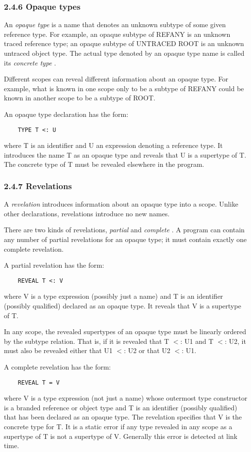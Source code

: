 \documentclass[10pt]{article}
\begin{document}
\subsubsection*{2.4.6 Opaque types}

An \emph{opaque type} is a name that denotes an unknown subtype of some given
reference type.  For example, an opaque subtype of REFANY is an unknown traced
reference type; an opaque subtype of UNTRACED ROOT is an unknown untraced
object type.  The actual type denoted by an opaque type name is called its
\emph{concrete type} .

Different scopes can reveal different information about an opaque type.  For
example, what is known in one scope only to be a subtype of REFANY could be
known in another scope to be a subtype of ROOT.

An opaque type declaration has the form:
\begin{verbatim}
    TYPE T <: U
\end{verbatim}
where T is an identifier and U an expression denoting a reference type.  It
introduces the name T as an opaque type and reveals that U is a supertype of
T.  The concrete type of T must be revealed elsewhere in the program.

\subsubsection*{2.4.7 Revelations}

A \emph{revelation} introduces information about an opaque type into a
scope.  Unlike other declarations, revelations introduce no new names.

There are two kinds of revelations, \emph{partial} and \emph{complete} .  A
program can contain any number of partial revelations for an opaque type; it
must contain exactly one complete revelation.

A partial revelation has the form:
\begin{verbatim}
    REVEAL T <: V
\end{verbatim}
where V is a type expression (possibly just a name) and T is an identifier
(possibly qualified) declared as an opaque type.  It reveals that V is a
supertype of T.

In any scope, the revealed supertypes of an opaque type must be linearly
ordered by the subtype relation.  That is, if it is revealed that T $<$: U1 and
T $<$: U2, it must also be revealed either that U1 $<$: U2 or that U2 $<$: U1.

A complete revelation has the form:
\begin{verbatim}
    REVEAL T = V
\end{verbatim}
where V is a type expression (not just a name) whose outermost type
constructor is a branded reference or object type and T is an identifier
(possibly qualified) that has been declared as an opaque type.  The revelation
specifies that V is the concrete type for T.  It is a static error if any type
revealed in any scope as a supertype of T is not a supertype of V.  Generally
this error is detected at link time.
\end{document}
